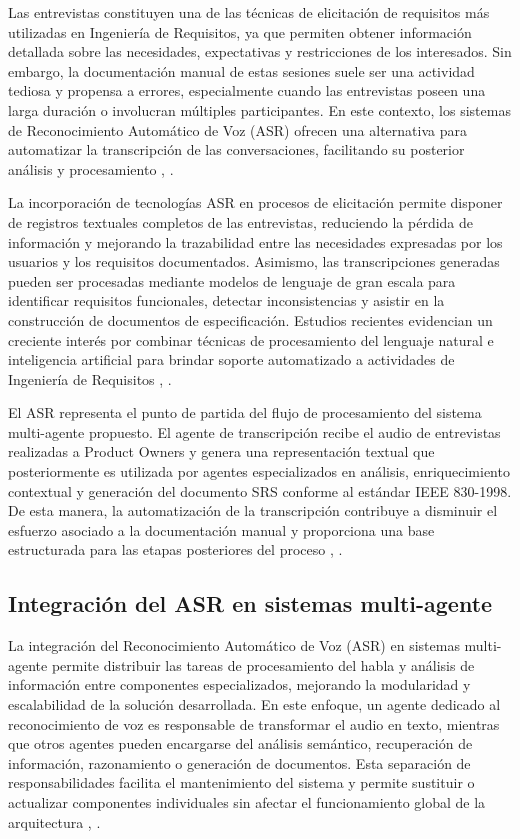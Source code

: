 Las entrevistas constituyen una de las técnicas de elicitación de requisitos más utilizadas en Ingeniería de Requisitos, ya que permiten obtener 
información detallada sobre las necesidades, expectativas y restricciones de los interesados. Sin embargo, la documentación manual de estas sesiones 
suele ser una actividad tediosa y propensa a errores, especialmente cuando las entrevistas poseen una larga duración o involucran múltiples 
participantes. En este contexto, los sistemas de Reconocimiento Automático de Voz (ASR) ofrecen una alternativa para automatizar la transcripción de 
las conversaciones, facilitando su posterior análisis y procesamiento \cite{Radford2022}, \cite{Umar2024}.

La incorporación de tecnologías ASR en procesos de elicitación permite disponer de registros textuales completos de las entrevistas, reduciendo la 
pérdida de información y mejorando la trazabilidad entre las necesidades expresadas por los usuarios y los requisitos documentados. Asimismo, las 
transcripciones generadas pueden ser procesadas mediante modelos de lenguaje de gran escala para identificar requisitos funcionales, detectar 
inconsistencias y asistir en la construcción de documentos de especificación. Estudios recientes evidencian un creciente interés por combinar 
técnicas de procesamiento del lenguaje natural e inteligencia artificial para brindar soporte automatizado a actividades de Ingeniería 
de Requisitos \cite{Umar2024}, \cite{Wolf2026}.

El ASR representa el punto de partida del flujo de procesamiento del sistema multi-agente propuesto. El agente de 
transcripción recibe el audio de entrevistas realizadas a Product Owners y genera una representación textual que posteriormente es utilizada por 
agentes especializados en análisis, enriquecimiento contextual y generación del documento SRS conforme al estándar IEEE 830-1998. De esta manera, 
la automatización de la transcripción contribuye a disminuir el esfuerzo asociado a la documentación manual y proporciona una base estructurada 
para las etapas posteriores del proceso \cite{Radford2022}, \cite{Wolf2026}.



\subsection{Integración del ASR en sistemas multi-agente}

La integración del Reconocimiento Automático de Voz (ASR) en sistemas multi-agente permite distribuir las tareas de procesamiento del habla y 
análisis de información entre componentes especializados, mejorando la modularidad y escalabilidad de la solución desarrollada. En este enfoque, 
un agente dedicado al reconocimiento de voz es responsable de transformar el audio en texto, mientras que otros agentes pueden encargarse del 
análisis semántico, recuperación de información, razonamiento o generación de documentos. Esta separación de responsabilidades facilita el mantenimiento 
del sistema y permite sustituir o actualizar componentes individuales sin afectar el funcionamiento global de la 
arquitectura \cite{Radford2022}, \cite{Guo2024}.


